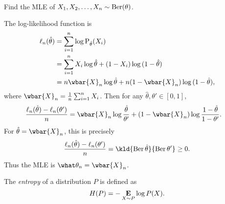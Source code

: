 \begin{exercise}
    Find the MLE of $X_1, X_2, \dots, X_n \sim \operatorname{Ber}(\theta)$.
\end{exercise}
\begin{solution}
    The log-likelihood function is \begin{align*}
        \ell_n(\hat\theta)
            &= \sum_{i=1}^{n} \log \Pr_{\hat\theta}(X_i) \\
            &= \sum_{i=1}^{n} X_i \log \hat\theta
                + (1 - X_i) \log{}(1 - \hat\theta) \\
            &= n \wbar{X}_n \log \hat\theta
                + n (1 - \wbar{X}_n) \log{}(1 - \hat\theta),
    \end{align*} where $\wbar{X}_n = \frac{1}{n} \sum_{i=1}^{n} X_i$.
    Then for any $\hat\theta, \theta' \in [0, 1]$, \begin{align*}
        \frac{\ell_n(\hat\theta) - \ell_n(\theta')}n
            &= \wbar{X}_n \log \frac{\hat\theta}{\theta'}
                + (1 - \wbar{X}_n) \log \frac{1 - \hat\theta}{1 - \theta'}.
    \end{align*}
    For $\hat\theta = \wbar{X}_n$, this is precisely \[
        \frac{\ell_n(\hat\theta) - \ell_n(\theta')}n
            = \kld{\Ber \hat\theta}{\Ber \theta'}
            \ge 0.
    \] Thus the MLE is $\what\theta_n = \wbar{X}_n$.
\end{solution}

\begin{definition*}[Entropy] \label{def:entropy}
    The \emph{entropy} of a distribution $P$ is defined as \[
        H(P) = -\operatorname*{\textbf{E}}_{X \sim P} \log P(X).
    \]
\end{definition*}

